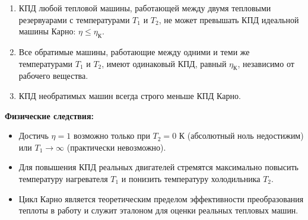 \begin{theorem}
\begin{enumerate}
    \item КПД любой тепловой машины, работающей между двумя тепловыми резервуарами с температурами $T_1$ и $T_2$, не может превышать КПД идеальной машины Карно: $\eta \le \eta_{\text{К}}$.
    \item Все обратимые машины, работающие между одними и теми же температурами $T_1$ и $T_2$, имеют одинаковый КПД, равный $\eta_{\text{К}}$, независимо от рабочего вещества.
    \item КПД необратимых машин всегда строго меньше КПД Карно.
\end{enumerate}
\end{theorem}

\begin{remark}
\textbf{Физические следствия:}
\begin{itemize}
    \item Достичь $\eta = 1$ возможно только при $T_2 = 0$ К (абсолютный ноль недостижим) или $T_1 \to \infty$ (практически невозможно).
    \item Для повышения КПД реальных двигателей стремятся максимально повысить температуру нагревателя $T_1$ и понизить температуру холодильника $T_2$.
    \item Цикл Карно является теоретическим пределом эффективности преобразования теплоты в работу и служит эталоном для оценки реальных тепловых машин.
\end{itemize}
\end{remark}
